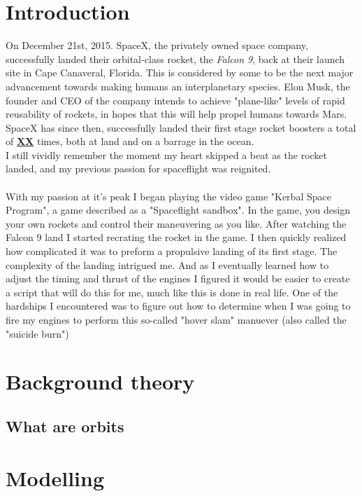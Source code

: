 \documentclass[12pt]{article}
\begin{document}
    \tableofcontents
    \thispagestyle{empty}
    \addtocounter{page}{-1}
    

    
    \newpage
    \section{Introduction} %
    On December 21st, 2015. SpaceX, the privately owned space company, successfully landed their orbital-class rocket, the \textit{Falcon 9}, back at their launch site in Cape Canaveral, Florida. 
    This is considered by some to be the next major advancement towards making humans an interplanetary species. Elon Musk, the founder and CEO of the company 
    intends to achieve "plane-like" levels of rapid reusability of rockets, in hopes that this will help propel humans towards Mars. 
    \\
    SpaceX has since then, successfully landed their first stage rocket boosters a total of \textbf{\underline{XX}} times, both at land and on a barrage in the ocean. 
    \\ 
    I still vividly remember the moment my heart skipped a beat as the rocket landed, and my previous passion for spaceflight was reignited.
    \paragraph{}
    With my passion at it's peak I began playing the video game "Kerbal Space Program", a game described as a "Spaceflight sandbox". In the game, you design your own rockets and 
    control their maneuvering as you like. After watching the Falcon 9 land I started recrating the rocket in the game. 
    I then quickly realized how complicated it was to preform a propulsive landing of its first stage. The complexity of the landing intrigued me. 
    And as I eventually learned how to adjust the timing and thrust of the engines I figured it would be easier to create a script that will do this for me, much like this is done in real life.
    \break
    One of the hardships I encountered was to figure out how to determine when I was going to fire my engines to perform this so-called "hover slam" manuever (also called the "suicide burn")

    



        





    \section{Background theory}
        \subsection{What are orbits}
    \section{Modelling}

    
\end{document}
